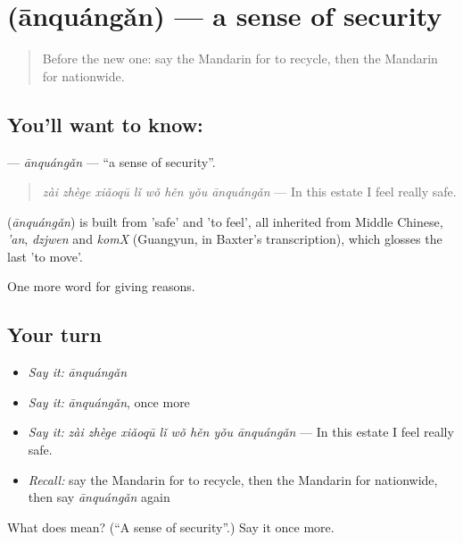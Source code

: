 \section[\texorpdfstring{\zh{安全感} (ānquángǎn)}{安全感 (ānquángǎn)}]{ (ānquángǎn) — a sense of security}

\label{lesson:ZH-C381-anquangan}



\begin{quote}
Before the new one: say the Mandarin for to recycle, then the Mandarin for nationwide.
\end{quote}

\subsection*{You'll want to know: }
\textbf{} — \emph{ānquángǎn} — \textquotedblleft{}a sense of security\textquotedblright{}.

\begin{quote}
\textbf{} \emph{zài zhège xiǎoqū lǐ wǒ hěn yǒu ānquángǎn} — In this estate I feel really safe.
\end{quote}

\begin{cousinweb}
\textbf{} (\emph{ānquángǎn}) is built from  'safe' and  'to feel', all inherited from Middle Chinese, \emph{'an}, \emph{dzjwen} and \emph{komX} (Guangyun, in Baxter's transcription), which glosses the last 'to move'.
\end{cousinweb}

\begin{grammarlens}[title={What you've built}]
One more word for giving reasons.
\end{grammarlens}

\subsection*{Your turn}
\begin{itemize}
\raggedright
  \item \emph{Say it:} \emph{ānquángǎn}
  \item \emph{Say it:} \emph{ānquángǎn}, once more
  \item \emph{Say it:} \emph{zài zhège xiǎoqū lǐ wǒ hěn yǒu ānquángǎn} — In this estate I feel really safe.
  \item \emph{Recall:} say the Mandarin for to recycle, then the Mandarin for nationwide, then say \emph{ānquángǎn} again
\end{itemize}

\begin{tcolorbox}[breakable,colback=teal!4,colframe=teal!35!black,title={Before you move on}]
What does  mean? (\textquotedblleft{}A sense of security\textquotedblright{}.) Say it once more.
\end{tcolorbox}
